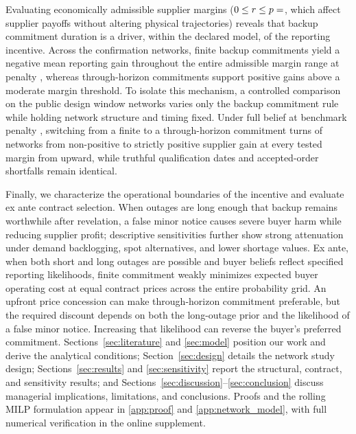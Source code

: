 \documentclass[preprint,11pt,authoryear]{elsarticle}
\newcommand{\claim}[1]{} %
\begin{document}
\claim{I8}Evaluating economically admissible supplier margins ($0\le r\le p=\pc{rMax}$, which affect supplier payoffs without altering physical trajectories) reveals that backup commitment duration is a driver, within the declared model, of the reporting incentive. Across the confirmation networks, finite backup commitments yield a negative mean reporting gain throughout the entire admissible margin range at penalty , whereas through-horizon commitments support positive gains above a moderate margin threshold. To isolate this mechanism, a controlled comparison on the  public design window networks varies only the backup commitment rule while holding network structure and timing fixed. Under full belief at benchmark penalty , switching from a finite to a through-horizon commitment turns  of  networks from non-positive to strictly positive supplier gain at every tested margin from  upward, while truthful qualification dates and accepted-order shortfalls remain identical.

\claim{I9}Finally, we characterize the operational boundaries of the incentive and evaluate ex ante contract selection. When outages are long enough that backup remains worthwhile after revelation, a false minor notice causes severe buyer harm while reducing supplier profit; descriptive sensitivities further show strong attenuation under demand backlogging, spot alternatives, and lower shortage values. Ex ante, when both short and long outages are possible and buyer beliefs reflect specified reporting likelihoods, finite commitment weakly minimizes expected buyer operating cost at equal contract prices across the entire probability grid. An upfront price concession can make through-horizon commitment preferable, but the required discount depends on both the long-outage prior and the likelihood of a false minor notice. Increasing that likelihood can reverse the buyer's preferred commitment. Sections~\ref{sec:literature} and \ref{sec:model} position our work and derive the analytical conditions; Section~\ref{sec:design} details the network study design; Sections~\ref{sec:results} and \ref{sec:sensitivity} report the structural, contract, and sensitivity results; and Sections~\ref{sec:discussion}--\ref{sec:conclusion} discuss managerial implications, limitations, and conclusions. Proofs and the rolling MILP formulation appear in \ref{app:proof} and \ref{app:network_model}, with full numerical verification in the online supplement.
\end{document}
